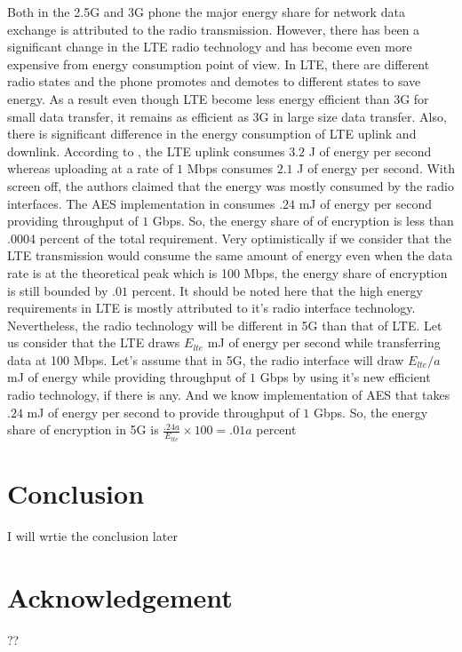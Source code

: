 Both in the 2.5G and 3G phone the major energy share for network data exchange is attributed to the radio transmission. However, there has been a significant change in the LTE radio technology and has become even more expensive from energy consumption point of view. In LTE, there are different radio states and the phone promotes and demotes to different states to save energy. As a result even though LTE become less energy efficient than 3G for small data transfer, it remains as efficient as 3G in large size data transfer. Also, there is significant difference in the energy consumption of LTE uplink and downlink. According to \cite{Mobisys_2012}, the LTE uplink consumes $3.2$ J of energy per second whereas uploading at a rate of $1$ Mbps consumes $2.1$ J of energy per second. With screen off, the authors claimed that the energy was mostly consumed by the radio interfaces. The AES implementation in \cite{Ruhr_2011} consumes $.24$ mJ of energy per second providing throughput of $1$ Gbps. So, the energy share of of encryption is less than .0004 percent of the total requirement. Very optimistically if we consider that the LTE transmission would consume the same amount of energy even when the data rate is at the theoretical peak which is 100 Mbps, the energy share of encryption is still bounded by $.01$ percent. It should be noted here that the high energy requirements in LTE is mostly attributed to it's radio interface technology. Nevertheless, the radio technology will be different in 5G than that of LTE. Let us consider that the LTE draws $E_{lte}$ mJ of energy per second while transferring data at 100 Mbps. Let's assume that in 5G, the radio interface will draw $E_{lte}/a$ mJ of energy while providing throughput of $1$ Gbps by using it's new efficient radio technology, if there is any. And we know implementation of AES that takes $.24$ mJ of energy per second to provide throughput of $1$ Gbps. So, the energy share of encryption in 5G is $\frac{.24a}{E_{lte}}\times 100 = .01a$ percent

\section{Conclusion}
\label{sec:conclusion}
I will wrtie the conclusion later

\section{Acknowledgement}
\label{sec:acknowledgement}
??




